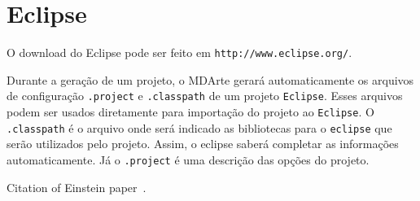 \section{Eclipse}

O download do Eclipse pode ser feito em \texttt{http://www.eclipse.org/}. 

Durante a geração de um projeto, o MDArte gerará automaticamente os arquivos de
configuração \texttt{.project} e \texttt{.classpath} de um projeto
\texttt{Eclipse}. Esses arquivos podem ser usados diretamente para importação do
projeto ao \texttt{Eclipse}. O \texttt{.classpath} é o arquivo onde será
indicado as bibliotecas para o \texttt{eclipse} que serão utilizados pelo
projeto. Assim, o eclipse saberá completar as informações automaticamente. Já o
\texttt{.project} é uma descrição das opções do projeto.

Citation of Einstein paper~\cite{Einstein}.